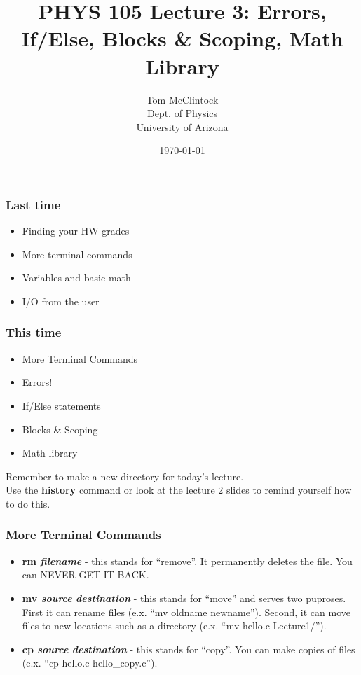 \documentclass{beamer}
\title{PHYS 105 Lecture 3: Errors, If/Else, Blocks \& Scoping, Math Library}
\author{Tom McClintock \\
	Dept. of Physics\\
	University of Arizona
}
\date{\today}
\begin{document}
\begin{frame}
  \titlepage
\end{frame}

\begin{frame}
  \frametitle{Last time}
  \begin{itemize}
    \item Finding your HW grades
    \item More terminal commands
    \item Variables and basic math
    \item I/O from the user
  \end{itemize}
\end{frame}

\begin{frame}
  \frametitle{This time}
  \begin{itemize}
    \item More Terminal Commands
    \item Errors!
    \item If/Else statements
    \item Blocks \& Scoping
    \item Math library
  \end{itemize}
  \vspace{12pt}
  Remember to make a new directory for today's lecture.\\
  Use the \textbf{history} command or look at the lecture 2 slides
  to remind yourself how to do this.
\end{frame}

\begin{frame}
  \frametitle{More Terminal Commands}
  \begin{itemize}
    \item \textbf{rm \textit{filename}} - this stands for ``remove''. 
      It permanently deletes the file. You can NEVER GET IT BACK.
    \item \textbf{mv \textit{source} \textit{destination}} - this stands
      for ``move'' and serves two puproses. First it can rename files 
      (e.x. ``mv oldname newname''). Second, it can move files to new
      locations such as a directory (e.x. ``mv hello.c Lecture1/'').
    \item \textbf{cp \textit{source} \textit{destination}} - this stands
      for ``copy''. You can make copies of files 
      (e.x. ``cp hello.c hello\_copy.c'').
  \end{itemize}
\end{frame}
\end{document}
